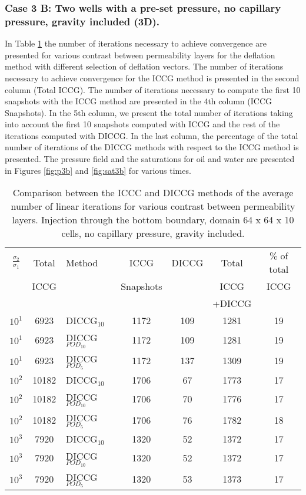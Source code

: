 \documentclass[12pt]{article}
\begin{document}
\subsubsection*{Case 3 B: Two wells with a pre-set pressure, no capillary pressure, gravity included (3D).}
In Table \ref{table:liter3b} the number of iterations necessary to achieve convergence are presented for various contrast between permeability layers for the deflation method with different selection of deflation vectors. The number of iterations necessary to achieve convergence for the ICCG method is presented in the second column (Total ICCG). The number of iterations necessary to compute the first 10 snapshots with the ICCG method are presented in the 4th column (ICCG Snapshots). In the 5th column, we present the total number of iterations taking into account the first 10 snapshots computed with ICCG and the rest of the iterations computed with DICCG. In the last column, the percentage of the total number of iterations of the DICCG methods with respect to the ICCG method is presented.   
The pressure field and the saturations for oil and water are presented in Figures \ref{fig:p3b} and \ref{fig:sat3b} for various times.
\begin{table}[!h]\centering
\begin{minipage}{1\textwidth}
 \centering
\begin{tabular}{ ||c|c||l|c|c|c|c||} 
\hline
$\frac{\sigma_2}{\sigma_1}$&Total&Method  & ICCG&DICCG &Total&\% of total\\ 
                           & ICCG     &  & Snapshots& &ICCG& ICCG\\ 
                            &     &  & & &+DICCG& \\
 \hline 
$10^{1}$ &6923& DICCG$_{10}$&1172&109&1281&19\\ 
\hline  
$10^{1}$ &6923& DICCG$_{POD_{10}}$&1172&109&1281&19 \\ 
\hline  
$10^{1}$ &6923& DICCG$_{POD_{5}}$&1172&137&1309&19 \\ 
\hline  
$10^{2}$ &10182& DICCG$_{10}$&1706&67&1773&17\\ 
\hline  
$10^{2}$ &10182& DICCG$_{POD_{10}}$&1706&70&1776&17 \\ 
\hline  
$10^{2}$ &10182& DICCG$_{POD_{5}}$&1706&76&1782&18 \\ 
\hline  
$10^{3}$ &7920& DICCG$_{10}$&1320&52&1372&17\\ 
\hline  
$10^{3}$ &7920& DICCG$_{POD_{10}}$&1320&52&1372&17 \\ 
\hline  
$10^{3}$ &7920& DICCG$_{POD_{5}}$&1320&53&1373&17 \\ 
\hline  
\end{tabular} 
\caption{Comparison between the ICCC and DICCG methods of the average number of linear iterations for various contrast between permeability layers. Injection through the bottom boundary, domain 64 x 64 x 10 cells, no capillary pressure, gravity included.}\label{table:liter3b} 
\end{minipage}  
\end{table}  
\end{document}
